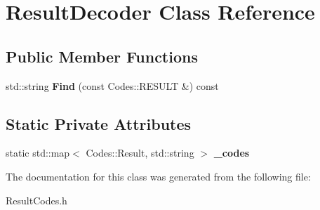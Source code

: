 \hypertarget{classResultDecoder}{
\section{ResultDecoder Class Reference}
\label{classResultDecoder}
}
\subsection*{Public Member Functions}
\begin{DoxyCompactItemize}
\item 
\hypertarget{classResultDecoder_af36f0e04752a354748bbada8c480c2b5}{
std::string {\bfseries Find} (const Codes::RESULT \&) const }
\label{classResultDecoder_af36f0e04752a354748bbada8c480c2b5}

\end{DoxyCompactItemize}
\subsection*{Static Private Attributes}
\begin{DoxyCompactItemize}
\item 
\hypertarget{classResultDecoder_af9fe128b51396fbb7a7cc833a012c885}{
static std::map$<$ Codes::Result, std::string $>$ {\bfseries \_\-codes}}
\label{classResultDecoder_af9fe128b51396fbb7a7cc833a012c885}

\end{DoxyCompactItemize}


The documentation for this class was generated from the following file:\begin{DoxyCompactItemize}
\item 
ResultCodes.h\end{DoxyCompactItemize}
